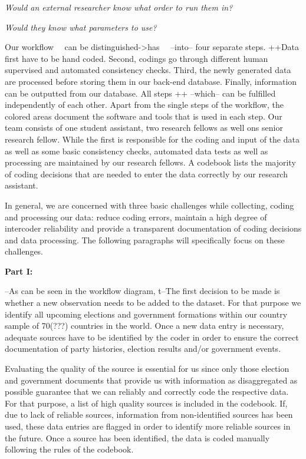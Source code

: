 \documentclass[
  11pt
]{article}
\begin{document}
\textit{Would an external researcher know what order to run them in?}

\textit{Would they know what parameters to use?}

\vspace*{1cm}

\noindent Our workflow {~~can be distinguished->has~~} {--into--} four separate steps. {++Data first have to be hand coded. Second, codings go through different human supervised and automated consistency checks. Third, the newly generated data are processed before storing them in our back-end database. Finally, information can be outputted from our database. All steps ++} {--which--} can be
fulfilled independently of each other. Apart from the single steps of the workflow, the colored areas
document the software and tools that is used in each step. Our team
consists of one student assistant, two research fellows as well ons
senior research fellow. While the first is responsible for the coding
and input of the data as well as some basic consistency checks,
automated data tests as well as processing are maintained by our
research fellows. A codebook lists the majority of coding decisions
that are needed to enter the data correctly by our research assistant.

In general, we are concerned with three basic challenges
while collecting, coding and processing our data: reduce
coding errors, maintain a high degree of intercoder
reliability and provide a transparent documentation of
coding decisions and data processing. The following
paragraphs will specifically focus on these challenges.

\textbf{Part I:}

{--As can be seen in the workflow diagram, t--}The first decision to be made is whether a new observation needs to be added to the dataset. For that purpose we identify all upcoming elections and government formations within our country sample of 70(???) countries in the world. Once a new data entry is necessary, adequate sources have to be identified by the coder in order to ensure the correct documentation of party histories, election results and/or government events.

Evaluating the quality of the source is essential for us since only those election and government documents that provide us with information as disaggregated as possible guarantee that we can reliably and correctly code the respective data. For that purpose, a list of high quality sources is included in the codebook. If, due to lack of reliable sources, information from non-identified sources has been used, these data entries are flagged in order to identify more reliable sources in the future. Once a source has been identified, the data is coded manually following the rules of the codebook.
\end{document}
